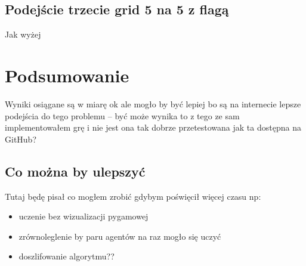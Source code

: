 \documentclass[a4paper,12pt,oneside]{book}
\begin{document}
\section{Podejście trzecie grid 5 na 5 z flagą}
Jak wyżej

\chapter{Podsumowanie}
Wyniki osiągane są w miarę ok ale mogło by być lepiej bo są na internecie lepsze
podejścia do tego problemu -- być może wynika to z tego ze sam implementowałem grę
i nie jest ona tak dobrze przetestowana jak ta dostępna na GitHub?
\section{Co można by ulepszyć}
Tutaj będę pisał co mogłem zrobić gdybym poświęcił więcej czasu np:
\begin{itemize}
\item uczenie bez wizualizacji pygamowej
\item zrównoleglenie by paru agentów na raz mogło się uczyć
\item doszlifowanie algorytmu??
\end{itemize}




\end{document}
